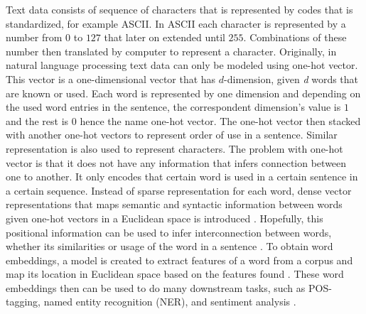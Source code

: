     Text data consists of sequence of characters that is represented
    by codes that is standardized, for example ASCII. In ASCII each
    character is represented by a number from $0$ to $127$ that later
    on extended until $255$. Combinations of these number then
    translated by computer to represent a character. Originally, in
    natural language processing text data can only be modeled using
    one-hot vector. This vector is a one-dimensional vector that has
    $d$-dimension, given \textit{d} words that are known or used. Each
    word is represented by one dimension and depending on the used word
    entries in the sentence, the correspondent dimension's value is
    $1$ and the rest is $0$ hence the name one-hot vector. The one-hot
    vector then stacked with another one-hot vectors to represent
    order of use in a sentence. Similar representation is also used to
    represent characters. The problem with one-hot vector is that it
    does not have any information that infers connection between one
    to another. It only encodes that certain word is used in a certain
    sentence in a certain sequence. Instead of sparse representation
    for each word, dense vector representations that maps semantic and
    syntactic information between words given one-hot vectors in a
    Euclidean space is introduced \citep{wordembedding2017yang,
    Distributed2013mikolov}. Hopefully, this positional information
    can be used to infer interconnection between words, whether its
    similarities or usage of the word in a sentence
    \citep{distributional1954harris}. To obtain word embeddings, a
    model is created to extract features of a word from a corpus and
    map its location in Euclidean space based on the features found
    \citep{Distributed2013mikolov, polyglot2013alrfou,
    dict2vect2017tissier}. These word embeddings then can be used to
    do many downstream tasks, such as POS-tagging, named entity
    recognition (NER), and sentiment analysis \citep{finding2015ling,
    neural2016lample}. 

